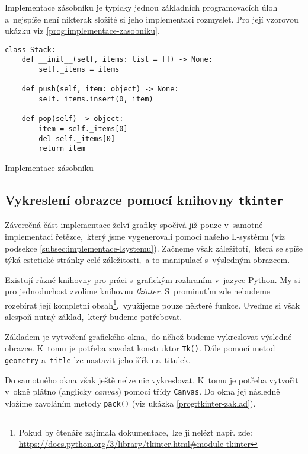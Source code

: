 Implementace zásobníku je typicky jednou základních programovacích úloh a~nejspíše není nikterak složité si jeho implementaci rozmyslet. Pro její vzorovou ukázku viz \ref{prog:implementace-zasobniku}.
\begin{program}[h]
\begin{lstlisting}[style=python]
class Stack:
    def __init__(self, items: list = []) -> None:
        self._items = items

    def push(self, item: object) -> None:
        self._items.insert(0, item)
    
    def pop(self) -> object:
        item = self._items[0]
        del self._items[0]
        return item  
\end{lstlisting}
    \caption{Implementace zásobníku}
    \label{prog:implementace-zasobniku}
\end{program}

\subsection{Vykreslení obrazce pomocí knihovny \texttt{tkinter}}\label{subsec:vykresleni-obrazce}

Záverečná část implementace želví grafiky spočívá již pouze v~samotné implementaci řetězce,~který jsme vygenerovali pomocí našeho L-systému (viz podsekce \ref{subsec:implementace-lsystemu}). Začneme však záležitotí,~která se spíše týká estetické stránky celé záležitosti,~a to manipulací s~výsledným obrazcem.

Existují různé knihovny pro práci s~grafickým rozhraním v~jazyce Python. My si pro jednoduchost zvolíme knihovnu \emph{tkinter}. S~prominutím zde nebudeme rozebírat její kompletní obsah\footnote{Pokud by čtenáře zajímala dokumentace,~lze ji nelézt např. zde: \url{https://docs.python.org/3/library/tkinter.html\#module-tkinter}},~využijeme pouze některé funkce. Uveďme si však alespoň nutný základ,~který budeme potřebovat.

Základem je vytvoření grafického okna,~do něhož budeme vykreslovat výsledné obrazce. K~tomu je potřeba zavolat konstruktor \texttt{Tk()}. Dále pomocí metod \texttt{geometry} a~\texttt{title} lze nastavit jeho šířku a~titulek.

Do samotného okna však ještě nelze nic vykreslovat. K~tomu je potřeba vytvořit v~okně plátno (anglicky \emph{canvas}) pomocí třídy \texttt{Canvas}. Do okna jej následně vložíme zavoláním metody \texttt{pack()} (viz ukázka \ref{prog:tkinter-zaklad}).

